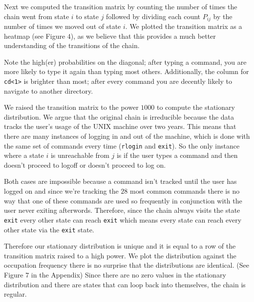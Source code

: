 \documentclass[10pt]{article}
\begin{document}
Next we computed the transition matrix by counting the number of times the chain
went from state $i$ to state $j$ followed by dividing each count $P_{ij}$ by the
number of times we moved out of state $i$. We plotted the transition matrix as a
heatmap (see Figure $4$), as we believe that this provides a much better
understanding of the transitions of the chain. 

Note the high(er) probabilities on the diagonal; after typing a command, you are
more likely to type it again than typing most others. Additionally, the column
for \texttt{cd<1>} is brighter than most; after every command you are decently
likely to navigate to another directory. 

We raised the transition matrix to the power $1000$ to compute the stationary
distribution. We argue that the original chain is irreducible because the data
tracks the user's usage of the UNIX machine over two years. This means that
there are many instances of logging in and out of the machine, which is done
with the same set of commands every time (\texttt{rlogin} and \texttt{exit}). So
the only instance where a state $i$ is unreachable from $j$ is if the user types
a command and then doesn't proceed to logoff or doesn't proceed to log on.

Both cases are impossible because a command isn't tracked until the user has
logged on and since we're tracking the $28$ most common commands there is no way
that one of these commands are used so frequently in conjunction with the user
never exiting afterwords.  Therefore, since the chain always visits the state
\texttt{exit} every other state can reach \texttt{exit} which means every  state
can reach every other state via the \texttt{exit} state.

Therefore our stationary distribution is unique and it is equal to a row of the
transition matrix raised to a high power. We plot the distribution against the
occupation frequency there is no surprise that the distributions are identical.
(See Figure $7$ in the Appendix) Since there are no zero values in the
stationary distribution and there are states that can loop back into themselves, the chain is regular.
\end{document}
